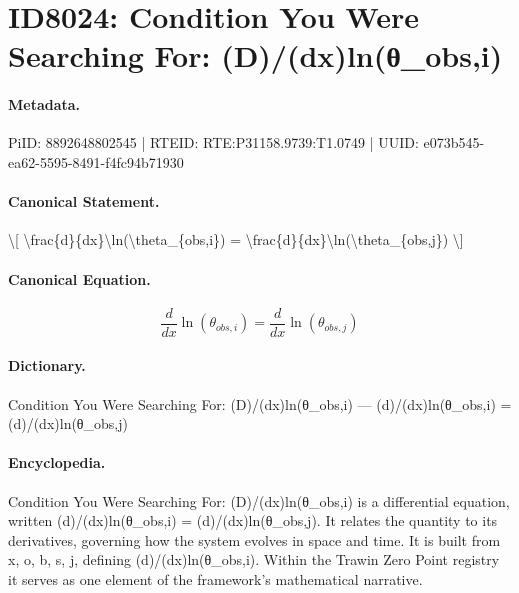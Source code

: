\section*{ID8024: Condition You Were Searching For: (D)/(dx)ln(θ\_obs,i)}
\paragraph{Metadata.}
PiID: 8892648802545 | RTEID: RTE:P31158.9739:T1.0749 | UUID: e073b545-ea62-5595-8491-f4fc94b71930

\paragraph{Canonical Statement.}
\textbackslash{}[ \textbackslash{}frac\{d\}\{dx\}\textbackslash{}ln(\textbackslash{}theta\_\{obs,i\}) = \textbackslash{}frac\{d\}\{dx\}\textbackslash{}ln(\textbackslash{}theta\_\{obs,j\}) \textbackslash{}]

\paragraph{Canonical Equation.}
\[
\frac{d}{dx}\ln(\theta_{obs,i}) = \frac{d}{dx}\ln(\theta_{obs,j})
\]

\paragraph{Dictionary.}
Condition You Were Searching For: (D)/(dx)ln(θ\_obs,i) — (d)/(dx)ln(θ\_obs,i) = (d)/(dx)ln(θ\_obs,j)

\paragraph{Encyclopedia.}
Condition You Were Searching For: (D)/(dx)ln(θ\_obs,i) is a differential equation, written (d)/(dx)ln(θ\_obs,i) = (d)/(dx)ln(θ\_obs,j). It relates the quantity to its derivatives, governing how the system evolves in space and time. It is built from x, o, b, s, j, defining (d)/(dx)ln(θ\_obs,i). Within the Trawin Zero Point registry it serves as one element of the framework's mathematical narrative.
